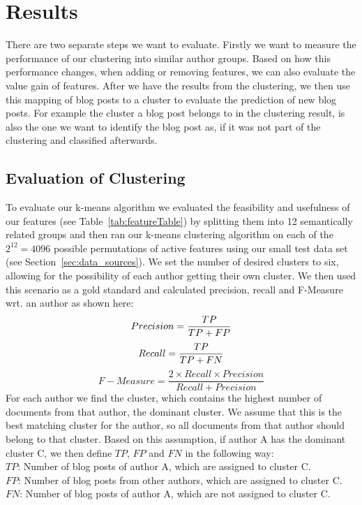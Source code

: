 \section{Results}
\label{sec:results}

There are two separate steps we want to evaluate.
Firstly we want to measure the performance of our clustering into similar author groups.
Based on how this performance changes, when adding or removing features, we can also evaluate the value gain of features.
After we have the results from the clustering, we then use this mapping of blog posts to a cluster to evaluate the prediction of new blog posts.
For example the cluster a blog post belongs to in the clustering result, is also the one we want to identify the blog post as, if it was not part of the clustering and classified afterwards.


\subsection{Evaluation of Clustering}
\label{sec:evaluation_clustering}
To evaluate our k-means algorithm we evaluated the feasibility and usefulness of our features (see Table~\ref{tab:featureTable}) by splitting them into 12 semantically related groups and then ran our k-means clustering algorithm on each of the $2^{12} = 4096$ possible permutations of active features using our small test data set (see Section~\ref{sec:data_sources}).
We set the number of desired clusters to six, allowing for the possibility of each author getting their own cluster.
We then used this scenario as a gold standard and calculated precision, recall and F-Measure wrt. an author as shown here:
\begin{equation}
	Precision = \frac{TP}{TP + FP} \\
	\label{eq:precision}
\end{equation}
\begin{equation}
	Recall = \frac{TP}{TP + FN} \\
	\label{eq:recall}
\end{equation}
\begin{equation}
	F-Measure = \frac{2 \times Recall \times Precision}{Recall + Precision}
	\label{eq:fMeasure}
\end{equation}
For each author we find the cluster, which contains the highest number of documents from that author, the dominant cluster.
We assume that this is the best matching cluster for the author, so all documents from that author should belong to that cluster.
Based on this assumption, if author A has the dominant cluster C, we then define $TP$, $FP$ and $FN$ in the following way: \\
$TP$: Number of blog posts of author A, which are assigned to cluster C. \\
$FP$: Number of blog posts from other authors, which are assigned to cluster C. \\
$FN$: Number of blog posts of author A, which are not assigned to cluster C.


